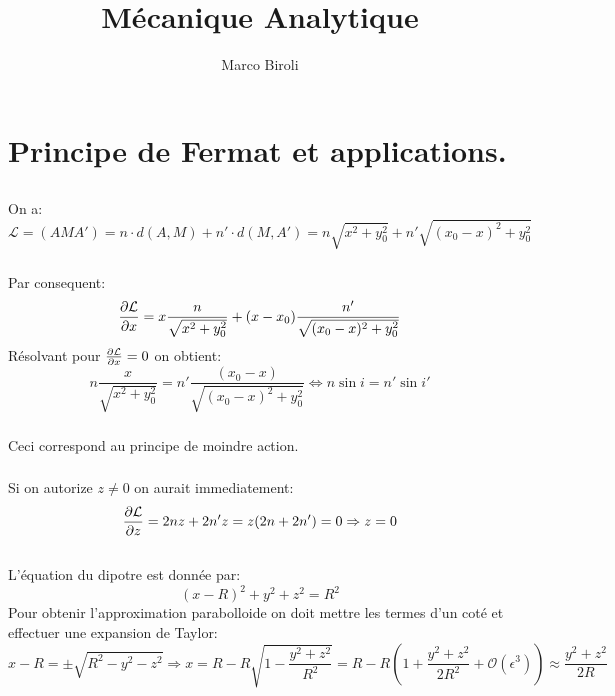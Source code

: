 \documentclass[10pt,a4paper]{article}
\author{Marco Biroli}
\title{Mécanique Analytique}
\begin{document}
\maketitle

\section{Principe de Fermat et applications.}
\subsection{}
\subsubsection{}
On a:
\[
\mathcal{L} = (AMA') = n \cdot d(A, M) + n' \cdot d(M, A') = n \sqrt{x^2 + y_0^2} + n'\sqrt{(x_0 - x)^2 + y_0^2}
\]
\subsubsection{}
Par consequent:
\[
\pdv{\mathcal{L}}{x} = x\frac{n}{\sqrt{x^2 + y_0^2}} + (x - x_0)\frac{n'}{\sqrt{(x_0 - x)^2 + y_0^2}}
\]
Résolvant pour $\pdv{\mathcal{L}}{x} = 0$ on obtient:
\[
n \frac{x}{\sqrt{x^2 + y_0^2}} = n' \frac{(x_0 - x)}{\sqrt{(x_0 - x)^2 + y_0^2}} \Leftrightarrow n \sin i = n' \sin i'
\]
\subsubsection{}
Ceci correspond au principe de moindre action.

\subsubsection{}
Si on autorize $z \neq 0$ on aurait immediatement:
\[
\pdv{\mathcal{L}}{z} = 2 n z  + 2 n' z = z(2n + 2n') = 0 \Rightarrow z = 0 
\]

\subsection{}
L'équation du dipotre est donnée par:
\[
(x-R)^2 + y^2 + z^2 = R^2
\]
Pour obtenir l'approximation parabolloide on doit mettre les termes d'un coté et effectuer une expansion de Taylor:
\[
x - R = \pm \sqrt{R^2 - y^2 - z^2} \Rightarrow x = R - R\sqrt{1 - \frac{y^2 + z^2}{R^2}} = R - R\left(1 + \frac{y^2 + z^2}{2R^2}+ \mathcal{O}(\epsilon^3) \right) \approx \frac{y^2 + z^2}{2R}
\]
\end{document}

